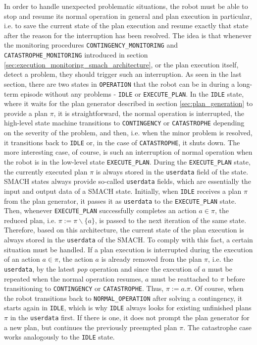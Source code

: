 \documentclass[english, master, utf8]{base/thesis_KBS}
\newcommand{\code}[1]{\colorbox{light-gray}{\texttt{#1}}}
\begin{document}
In order to handle unexpected problematic situations, the robot must be able to stop and resume its normal operation in general
and plan execution in particular, i.e. to save the current state of the plan execution and resume exactly that state after the reason
for the interruption has been resolved. The idea is that whenever the monitoring procedures \code{CONTINGENCY\_MONITORING} and \code{CATASTROPHE\_MONITORING} 
introduced in section \ref{sec:execution_monitoring_smach_architecture}, or the plan execution itself, detect a problem, they should trigger such an interruption.
As seen in the last section, there are two states in \code{OPERATION} that the robot can be in during a long-term episode without any problems
- \code{IDLE} or \code{EXECUTE\_PLAN}. In the \code{IDLE} state, where it waits for the plan generator described in section \ref{sec:plan_generation} to provide a plan $\pi$,
it is straightforward, the normal operation is interrupted, the high-level state machine transitions to \code{CONTINGENCY} or \code{CATASTROPHE} depending
on the severity of the problem, and then, i.e. when the minor problem is resolved, it transitions back to \code{IDLE} or, in the case of \code{CATASTROPHE},
it shuts down. The more interesting case, of course, is such an interruption of normal operation when the robot is in the low-level state \code{EXECUTE\_PLAN}.
During the \code{EXECUTE\_PLAN} state, the currently executed plan $\pi$ is always stored in the \code{userdata} field of the state.
SMACH states always provide so-called \code{userdata} fields, which are essentially the input and output data of a SMACH state.
Initially, when \code{IDLE} receives a plan $\pi$ from the plan generator, it passes it as \code{userdata} to the \code{EXECUTE\_PLAN} state. Then, whenever \code{EXECUTE\_PLAN}
successfully completes an action $a \in \pi$, the reduced plan, i.e. $\pi := \pi \backslash \{a\}$, is passed to the next iteration of the same state.
Therefore, based on this architecture, the current state of the plan execution is always stored in the \code{userdata} of the SMACH. To comply with this fact, a certain situation
must be handled. If a plan execution is interrupted during the execution of an action $a \in \pi$, the action $a$ is already removed from the plan $\pi$, i.e. the \code{userdata},
by the latest \textit{pop} operation and since the execution of $a$ must be repeated when the normal operation resumes, $a$ must be reattached to $\pi$ before transitioning
to \code{CONTINGENCY} or \code{CATASTROPHE}. Thus, $\pi := a.\pi$.
Of course, when the robot transitions back to \code{NORMAL\_OPERATION} after solving a contingency, it starts again in \code{IDLE}, which is why \code{IDLE}
always looks for existing unfinished plans $\pi$ in the \code{userdata} first. If there is one, it does not prompt the plan generator for a new plan, but continues the previously
preempted plan $\pi$. The catastrophe case works analogously to the \code{IDLE} state.
\end{document}
